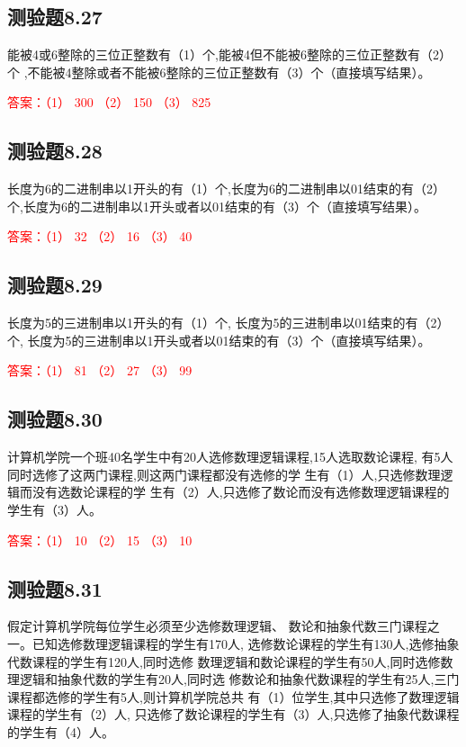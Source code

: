 \documentclass[UTF8, heading=true]{ctexart}
\begin{document}
\subsection{测验题8.27}
能被4或6整除的三位正整数有（1）个,能被4但不能被6整除的三位正整数有（2）个
,不能被4整除或者不能被6整除的三位正整数有（3）个（直接填写结果）。

\textcolor{red}{答案：（1） 300 （2） 150 （3） 825}

\subsection{测验题8.28}

长度为6的二进制串以1开头的有（1）个,长度为6的二进制串以01结束的有（2）个,长度为6的二进制串以1开头或者以01结束的有（3）个（直接填写结果）。

\textcolor{red}{答案：（1） 32 （2） 16 （3） 40}

\subsection{测验题8.29}

长度为5的三进制串以1开头的有（1）个,
长度为5的三进制串以01结束的有（2）个,
长度为5的三进制串以1开头或者以01结束的有（3）个（直接填写结果）。

\textcolor{red}{答案：（1） 81 （2） 27 （3） 99}

\subsection{测验题8.30}

计算机学院一个班40名学生中有20人选修数理逻辑课程,15人选取数论课程,
有5人同时选修了这两门课程,则这两门课程都没有选修的学
生有（1）人,只选修数理逻辑而没有选数论课程的学
生有（2）人,只选修了数论而没有选修数理逻辑课程的学生有（3）人。

\textcolor{red}{答案：（1） 10 （2） 15 （3） 10}

\subsection{测验题8.31}

假定计算机学院每位学生必须至少选修数理逻辑、
数论和抽象代数三门课程之一。已知选修数理逻辑课程的学生有170人,
选修数论课程的学生有130人,选修抽象代数课程的学生有120人,同时选修
数理逻辑和数论课程的学生有50人,同时选修数理逻辑和抽象代数的学生有20人,同时选
修数论和抽象代数课程的学生有25人,三门课程都选修的学生有5人,则计算机学院总共
有（1）位学生,其中只选修了数理逻辑课程的学生有（2）人,
只选修了数论课程的学生有（3）人,只选修了抽象代数课程的学生有（4）人。
\end{document}
